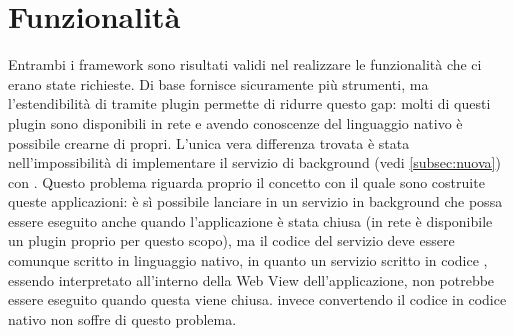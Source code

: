     \section{Funzionalità}
    Entrambi i frame\-work sono risultati validi nel realizzare le
    funzionalità che ci erano state richieste. Di base \tisdk{} fornisce
    sicuramente più strumenti, ma l'estendibilità di \pg{} tramite plugin
    permette di ridurre questo gap: molti di questi plugin sono
    disponibili in rete e avendo conoscenze del linguaggio nativo è
    possibile crearne di propri. L'unica vera differenza
    trovata è stata nell'impossibilità di implementare il servizio di
    background (vedi \ref{subsec:nuova}) con \pg{}. Questo problema
    riguarda proprio il concetto con
    il quale sono costruite queste applicazioni: è sì possibile lanciare
    in \js{}
    un servizio in background che possa essere eseguito anche quando
    l'applicazione è stata chiusa (in rete è disponibile un plugin proprio
    per questo scopo), ma il codice del servizio deve essere comunque
    scritto in linguaggio nativo, in quanto un servizio scritto in codice
    \js{}, essendo interpretato all'interno della Web View
    dell'applicazione, non potrebbe essere eseguito quando questa viene
    chiusa.
    \tisdk{} invece convertendo il codice \js{} in codice nativo non
    soffre di questo problema.


